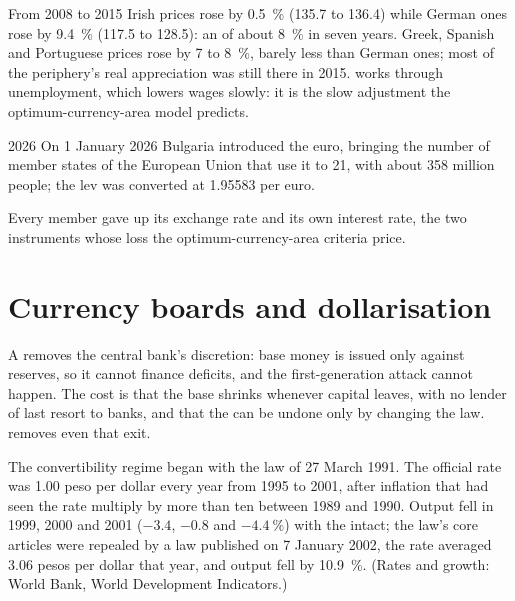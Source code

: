 From 2008 to 2015 Irish prices rose by 0.5~\% (135.7 to 136.4) while German ones rose
by 9.4~\% (117.5 to 128.5): an  of about 8~\% in seven years. Greek,
Spanish and Portuguese prices rose by 7 to 8~\%, barely less than German ones; most of
the periphery's real appreciation was still there in 2015. 
works through unemployment, which lowers wages slowly: it is the slow adjustment
the optimum-currency-area model predicts.

\begin{record}
\begin{dated}{2026}
On 1 January 2026 Bulgaria introduced the euro, bringing the number of member
states of the European Union that use it to 21, with about 358 million people; the
lev was converted at 1.95583 per euro. %
\end{dated}
Every member gave up its exchange rate and its own interest rate, the two
instruments whose loss the optimum-currency-area criteria price.
\end{record}

\section{Currency boards and dollarisation}\label{sec:b3:exchange-rate-regimes:boards}

A  removes the central bank's discretion: base money is issued only
against reserves, so it cannot finance deficits, and the first-generation attack
cannot happen. The cost is that the base shrinks whenever capital leaves, with no
lender of last resort to banks, and that the  can be undone only by changing
the law.  removes even that exit.

\begin{record}
The convertibility regime began with the law of 27 March 1991. %
The official rate was 1.00 peso per dollar every year from 1995 to 2001, after
inflation that had seen the rate multiply by more than ten between 1989 and 1990.
Output fell in 1999, 2000 and 2001 ($-3.4$, $-0.8$ and $-4.4~\%$) with the  intact; the
law's core articles were repealed by a law published on 7 January 2002, the rate
averaged 3.06 pesos per dollar that year, and output fell by 10.9~\%. (Rates and
growth: World Bank, World Development Indicators.)
\end{record}

